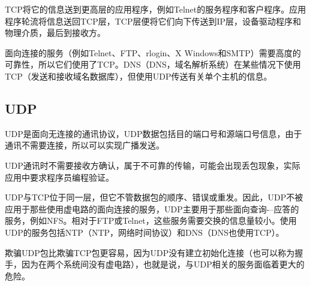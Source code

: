 TCP{\cf}将它{\cf}的信{\cf}息送{\cf}到更{\cf}高层{\cf}的应{\cf}用程{\cf}序，{\cf}例如{\cf}Te{\cf}ln{\cf}et{\cf}的服{\cf}务程{\cf}序和{\cf}客户{\cf}程序{\cf}。应{\cf}用程{\cf}序轮{\cf}流将{\cf}信息{\cf}送回{\cf}TC{\cf}P层{\cf}，T{\cf}CP{\cf}层便{\cf}将它{\cf}们向{\cf}下传{\cf}送到{\cf}IP{\cf}层，{\cf}设备{\cf}驱动{\cf}程序{\cf}和物{\cf}理介{\cf}质，{\cf}最后{\cf}到接收方。

面{\cf}向连{\cf}接的{\cf}服务{\cf}（例{\cf}如T{\cf}el{\cf}ne{\cf}t、{\cf}FT{\cf}P、{\cf}rl{\cf}og{\cf}in{\cf}、X{\cf} W{\cf}in{\cf}do{\cf}ws{\cf}和S{\cf}MT{\cf}P）{\cf}需要{\cf}高度{\cf}的可{\cf}靠性{\cf}，所{\cf}以它{\cf}们使{\cf}用了{\cf}TCP。\acrshort{DNS}（\acrlong{DNS}，域名解析系统）在{\cf}某些{\cf}情况{\cf}下使{\cf}用T{\cf}CP{\cf}（发{\cf}送和{\cf}接收{\cf}域名{\cf}数据{\cf}库）{\cf}，但{\cf}使用{\cf}UD{\cf}P传{\cf}送有{\cf}关单{\cf}个主{\cf}机的{\cf}信息。

\subsection{UDP}
UDP{\cf}是面{\cf}向无{\cf}连接{\cf}的通{\cf}讯协{\cf}议，{\cf}UD{\cf}P数{\cf}据包{\cf}括目{\cf}的端{\cf}口号{\cf}和源{\cf}端口{\cf}号信{\cf}息，{\cf}由于{\cf}通讯{\cf}不需{\cf}要连{\cf}接，{\cf}所以{\cf}可以{\cf}实现{\cf}广播{\cf}发送。

UDP{\cf}通讯{\cf}时不{\cf}需要{\cf}接收{\cf}方确{\cf}认，{\cf}属于{\cf}不可{\cf}靠的{\cf}传输{\cf}，可{\cf}能会{\cf}出现{\cf}丢包{\cf}现象{\cf}，实{\cf}际应{\cf}用中{\cf}要求{\cf}程序{\cf}员编{\cf}程验证。

UDP{\cf}与T{\cf}CP{\cf}位于{\cf}同一{\cf}层，{\cf}但它{\cf}不管{\cf}数据{\cf}包的{\cf}顺序{\cf}、错{\cf}误或{\cf}重发{\cf}。因{\cf}此，{\cf}UD{\cf}P不{\cf}被应{\cf}用于{\cf}那些{\cf}使用{\cf}虚电{\cf}路的{\cf}面向{\cf}连接{\cf}的服{\cf}务，{\cf}UD{\cf}P主{\cf}要用{\cf}于那{\cf}些面{\cf}向查{\cf}询-{\cf}--{\cf}应答{\cf}的服{\cf}务，{\cf}例如{\cf}NF{\cf}S。{\cf}相对{\cf}于F{\cf}TP{\cf}或T{\cf}el{\cf}ne{\cf}t，{\cf}这些{\cf}服务{\cf}需要{\cf}交换{\cf}的信{\cf}息量{\cf}较小{\cf}。使{\cf}用U{\cf}DP{\cf}的服{\cf}务包括\acrshort{NTP}（\acrlong{NTP}，网络时间协议）和\acrshort{DNS}（\acrshort{DNS}也使用TCP）。

欺{\cf}骗U{\cf}DP{\cf}包比{\cf}欺骗{\cf}TC{\cf}P包{\cf}更容{\cf}易，{\cf}因为{\cf}UD{\cf}P没{\cf}有建{\cf}立初{\cf}始化{\cf}连接{\cf}（也{\cf}可以{\cf}称为{\cf}握手{\cf}，因{\cf}为在{\cf}两个{\cf}系统{\cf}间没{\cf}有虚{\cf}电路{\cf}），{\cf}也就{\cf}是说{\cf}，与{\cf}UD{\cf}P相{\cf}关的{\cf}服务{\cf}面临{\cf}着更{\cf}大的{\cf}危险。

